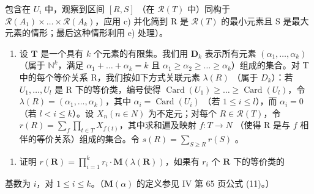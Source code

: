 包含在 \(U_{i}\) 中，观察到区间 \([R, S]\) （在 \(\mathcal{R}(T)\) 中）同构于 \(\mathcal{R}(A_{1}) \times \ldots \times \mathcal{R}(A_{k})\)，应用 c) 并化简到 R 是 \(\mathcal{R}(T)\) 的最小元素且 S 是最大元素的情形；最后这种情形利用 e) 处理）。

\begin{enumerate}
\def\labelenumi{\arabic{enumi})}
\setcounter{enumi}{14}
\tightlist
\item
  设 \(\mathbf{T}\) 是一个具有 \(k\) 个元素的有限集。我们用 \(\mathbf{D}_k\) 表示所有元素 \((\alpha_1, \ldots, \alpha_k)\)（属于 \(\mathbb{N}^k\)，满足 \(\alpha_1 + \ldots + \alpha_k = k\) 且 \(\alpha_1 \geqslant \alpha_2 \geqslant \ldots \geqslant \alpha_k\)）组成的集合。对 T 中的每个等价关系 R，我们按如下方式关联元素 \(\lambda(R)\) （属于 \(D_k\)）：若 \(U_1, \ldots, U_l\) 是 R 下的等价类，编号使得 \(\operatorname{Card}(U_1) \geqslant \ldots \geqslant \operatorname{Card}(U_l)\)，令 \(\lambda(R) = (\alpha_1, \ldots, \alpha_k)\)，其中 \(\alpha_i = \operatorname{Card}(U_i)\) （若 \(1 \leqslant i \leqslant l\)），而 \(\alpha_i = 0\) （若 \(l < i \leqslant k\)）。设 \(X_n (n \in N)\) 为不定元；对每个 \(R \in \mathcal{R}(T)\)，令 \(r(R) = \sum_{f} \prod_{t \in T} X_{f(t)}\)，其中求和遍及映射 \(f: T \to N\) （使得 R 是与 \(f\) 相伴的等价关系）组成的集合。令 \(s(R) = \sum_{S \geqslant R} r(S)\) 。
\end{enumerate}

\begin{enumerate}
\def\labelenumi{\alph{enumi})}
\tightlist
\item
  证明 \(r(\mathbf{R}) = \prod_{i=1}^{k} r_i \cdot \mathbf{M}(\lambda(\mathbf{R}))\)，如果有 \(r_i\) 个 \(\mathbf{R}\) 下的等价类的
\end{enumerate}

基数为 \(i\)，对 \(1 \leqslant i \leqslant k\)。（\(\mathbf{M}(\alpha)\) 的定义参见 IV 第 65 页公式 (11)。）


